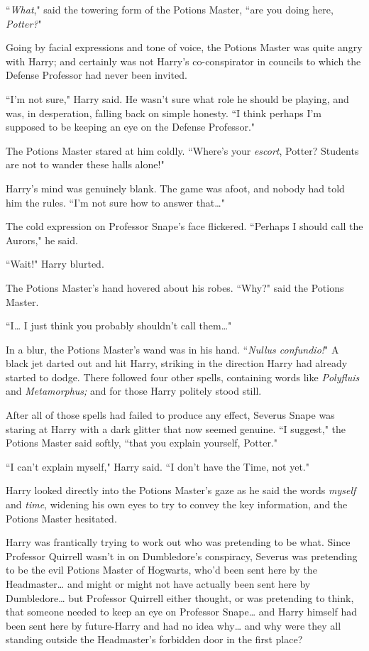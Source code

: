 ``\emph{What}," said the towering form of the Potions Master, ``are you doing here, \emph{Potter?}"

Going by facial expressions and tone of voice, the Potions Master was quite angry with Harry; and certainly was not Harry's co-conspirator in councils to which the Defense Professor had never been invited.

``I'm not sure," Harry said. He wasn't sure what role he should be playing, and was, in desperation, falling back on simple honesty. ``I think perhaps I'm supposed to be keeping an eye on the Defense Professor."

The Potions Master stared at him coldly. ``Where's your \emph{escort}, Potter? Students are not to wander these halls alone!"

Harry's mind was genuinely blank. The game was afoot, and nobody had told him the rules. ``I'm not sure how to answer that{\ldots}"

The cold expression on Professor Snape's face flickered. ``Perhaps I should call the Aurors," he said.

``Wait!" Harry blurted.

The Potions Master's hand hovered about his robes. ``Why?" said the Potions Master.

``I{\ldots} I just think you probably shouldn't call them{\ldots}"

In a blur, the Potions Master's wand was in his hand. ``\emph{Nullus confundio!}" A black jet darted out and hit Harry, striking in the direction Harry had already started to dodge. There followed four other spells, containing words like \emph{Polyfluis} and \emph{Metamorphus;} and for those Harry politely stood still.

After all of those spells had failed to produce any effect, Severus Snape was staring at Harry with a dark glitter that now seemed genuine. ``I suggest," the Potions Master said softly, ``that you explain yourself, Potter."

``I can't explain myself," Harry said. ``I don't have the Time, not yet."

Harry looked directly into the Potions Master's gaze as he said the words \emph{myself} and \emph{time}, widening his own eyes to try to convey the key information, and the Potions Master hesitated.

Harry was frantically trying to work out who was pretending to be what. Since Professor Quirrell wasn't in on Dumbledore's conspiracy, Severus was pretending to be the evil Potions Master of Hogwarts, who'd been sent here by the Headmaster{\ldots} and might or might not have actually been sent here by Dumbledore{\ldots} but Professor Quirrell either thought, or was pretending to think, that someone needed to keep an eye on Professor Snape{\ldots} and Harry himself had been sent here by future-Harry and had no idea why{\ldots} and why were they all standing outside the Headmaster's forbidden door in the first place?

